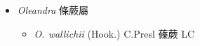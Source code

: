 
  \begin{itemize}
 \item[] \textit{Oleandra} 條蕨屬
                                
  \begin{itemize}
        \item[] \textit{O. wallichii} (Hook.) C.Presl  蓧蕨   LC
  \end{itemize}
  \end{itemize}
